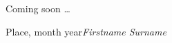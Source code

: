 %
%

\foreword

Coming soon \ldots

\vspace{\baselineskip}
\begin{flushright}\noindent
Place, month year\hfill {\it Firstname  Surname}\\
\end{flushright}


